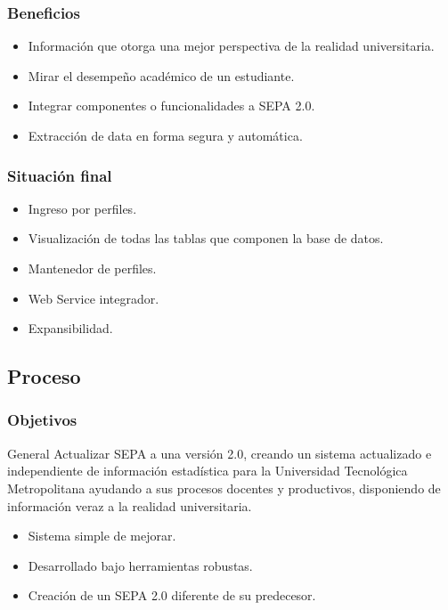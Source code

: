 \documentclass{beamer}
\begin{document}

\begin{frame}
\frametitle{Beneficios}
\begin{itemize}
\item Información que otorga una mejor perspectiva de la realidad universitaria.
\item Mirar el desempeño académico de un estudiante.
\item Integrar componentes o funcionalidades a SEPA 2.0.
\item Extracción de data en forma segura y automática.
\end{itemize}
\end{frame}


\begin{frame}
\frametitle{Situación final}
\begin{itemize}
\item Ingreso por perfiles.
\item Visualización de todas las tablas que componen la base de datos.
\item Mantenedor de perfiles.
\item Web Service integrador.
\item Expansibilidad.
\end{itemize}
\end{frame}


\subsection{Proceso}

\begin{frame}
\frametitle{Objetivos}
\begin{block}{General}
Actualizar SEPA a una versión 2.0, creando un sistema actualizado e independiente de información estadística para la Universidad Tecnológica Metropolitana ayudando a sus procesos docentes y productivos, disponiendo de información veraz a la realidad universitaria.
\end{block}


\begin{itemize}
\item Sistema simple de mejorar.
\item Desarrollado bajo herramientas robustas.
\item Creación de un SEPA 2.0 diferente de su predecesor.
\end{itemize}
\end{frame}
\end{document}

